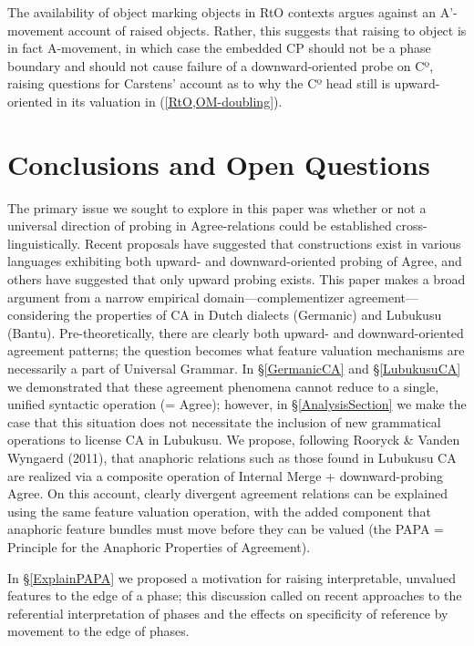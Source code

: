 The availability of object marking objects in RtO contexts argues against an A’-movement account of raised objects. Rather, this suggests that raising to object is in fact A-movement, in which case the embedded CP should not be a phase boundary and should not cause failure of a downward-oriented probe on Cº, raising questions for Carstens’ account as to why the Cº head still is upward-oriented in its valuation in (\ref{RtO,OM-doubling}).

\section{Conclusions and Open Questions}

The primary issue we sought to explore in this paper was whether or not a universal direction of probing in Agree-relations could be established cross-linguistically. Recent proposals have suggested that constructions exist in various languages exhibiting both upward- and downward-oriented probing of Agree, and others have suggested that only upward probing exists. This paper makes a broad argument from a narrow empirical domain—complementizer agreement—considering the properties of CA in Dutch dialects (Germanic) and Lubukusu (Bantu). Pre-theoretically, there are clearly both upward- and downward-oriented agreement patterns; the question becomes what feature valuation mechanisms are necessarily a part of Universal Grammar. In \S \ref{GermanicCA} and \S \ref{LubukusuCA} we demonstrated that these agreement phenomena cannot reduce to a single, unified syntactic operation (= Agree); however, in \S \ref{AnalysisSection} we make the case that this situation does not necessitate the inclusion of new grammatical operations to license CA in Lubukusu. We propose, following Rooryck \& Vanden Wyngaerd (2011), that anaphoric relations such as those found in Lubukusu CA are realized via a composite operation of Internal Merge + downward-probing Agree. On this account, clearly divergent agreement relations can be explained using the same feature valuation operation, with the added component that anaphoric feature bundles must move before they can be valued (the PAPA = Principle for the Anaphoric Properties of Agreement). 

In \S \ref{ExplainPAPA} we proposed a motivation for raising interpretable, unvalued features to the edge of a phase; this discussion called on recent approaches to the referential interpretation of phases and the effects on specificity of reference by movement to the edge of phases. 
        
